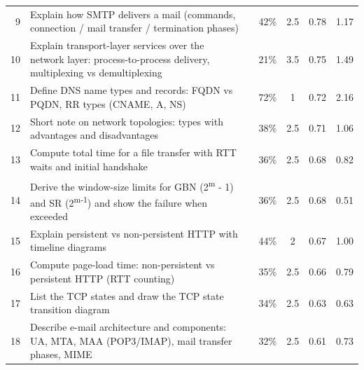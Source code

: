 {\begin{xltabular}{\linewidth}{r>{\raggedright\arraybackslash}Xccccc}
9 & Explain how SMTP delivers a mail (commands, connection / mail transfer / termination phases) &  & 42\% & 2.5 & 0.78 & 1.17\\
10 & Explain transport-layer services over the network layer: process-to-process delivery, multiplexing vs demultiplexing &  & 21\% & 3.5 & 0.75 & 1.49\\
11 & Define DNS name types and records: FQDN vs PQDN, RR types (CNAME, A, NS) &  & 72\% & 1 & 0.72 & 2.16\\
12 & Short note on network topologies: types with advantages and disadvantages &  & 38\% & 2.5 & 0.71 & 1.06\\
13 & Compute total time for a file transfer with RTT waits and initial handshake &  & 36\% & 2.5 & 0.68 & 0.82\\
14 & Derive the window-size limits for GBN (2\textsuperscript{m} - 1) and SR (2\textsuperscript{m-1}) and show the failure when exceeded &  & 36\% & 2.5 & 0.68 & 0.51\\
15 & Explain persistent vs non-persistent HTTP with timeline diagrams &  & 44\% & 2 & 0.67 & 1.00\\
16 & Compute page-load time: non-persistent vs persistent HTTP (RTT counting) &  & 35\% & 2.5 & 0.66 & 0.79\\
17 & List the TCP states and draw the TCP state transition diagram &  & 34\% & 2.5 & 0.63 & 0.63\\
18 & Describe e-mail architecture and components: UA, MTA, MAA (POP3/IMAP), mail transfer phases, MIME &  & 32\% & 2.5 & 0.61 & 0.73\\

\end{xltabular}}
